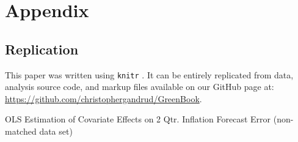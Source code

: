 \documentclass[a4paper]{article}\usepackage{graphicx, color}
\begin{document}
\clearpage
\section*{Appendix}

\subsection*{Replication}

This paper was written using {\tt{knitr}} \citep{knitr2012}. It can be entirely replicated from data, analysis source code, and markup files available on our GitHub page at: {\url{https://github.com/christophergandrud/GreenBook}}. 


\begin{table}[ht]
    \caption{OLS Estimation of Covariate Effects on 2 Qtr. Inflation Forecast Error (non-matched data set)}
    \label{OutputNL}
    \vspace{0.25cm}
    \begin{center}
    {\tiny

}
\end{center}
\end{table}
\end{document}
